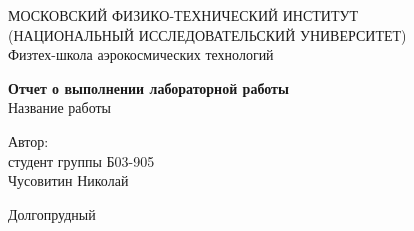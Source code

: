 \begin{titlepage}
\begin{center}
\large МОСКОВСКИЙ ФИЗИКО-ТЕХНИЧЕСКИЙ ИНСТИТУТ \\
(НАЦИОНАЛЬНЫЙ ИССЛЕДОВАТЕЛЬСКИЙ УНИВЕРСИТЕТ) \\
Физтех-школа аэрокосмических технологий 
\end{center}
\vspace{8cm}



\begin{center}
\begin{huge}
\textbf{Отчет о выполнении лабораторной работы} \\
Название работы
\end{huge}
\end{center}

\vspace{4cm}

\begin{flushright}
\LARGE
Автор:\\
студент группы Б03-905\\
Чусовитин Николай
\end{flushright}

\vfill

\begin{center}
Долгопрудный \the\year
\end{center}
\end{titlepage}
